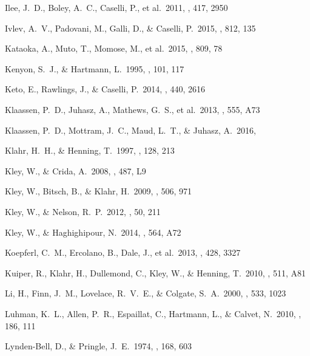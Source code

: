 \begin{thebibliography}{2000b}
 Ilee, J.~D., Boley, A.~C., 
Caselli, P., et al.\ 2011, \mnras, 417, 2950

 Ivlev, A.~V., Padovani, M., Galli, D., \& Caselli, P.\ 2015, \apj, 812, 135 

 Kataoka, A., Muto, T., 
Momose, M., et al.\ 2015, \apj, 809, 78 

 Kenyon, S.~J., \& Hartmann, L.\ 1995, \apjs, 101, 117 

 Keto, E., Rawlings, J., \& Caselli, P.\ 2014, \mnras, 440, 2616 

 Klaassen, P.~D., Juhasz, A., Mathews, G.~S., et al.\ 2013, \aap, 555, A73

 Klaassen, P.~D., Mottram, J.~C., Maud, L.~T., \& Juhasz, A.\ 2016, \mnras

 Klahr, H.~H., \& Henning, T.\ 1997, \icarus, 128, 213 

 Kley, W., \& Crida, A.\ 2008, \aap, 487, L9 

 Kley, W., Bitsch, B., \& Klahr, H.\ 2009, \aap, 506, 971 

 Kley, W., \& Nelson, R.~P.\ 2012, \araa, 50, 211 

 Kley, W., \& Haghighipour, N.\ 2014, \aap, 564, A72 

 Koepferl, C.~M., 
Ercolano, B., Dale, J., et al.\ 2013, \mnras, 428, 3327 

 Kuiper, R., Klahr, H., Dullemond, C., Kley, W., \& Henning, T.\ 2010, \aap, 511, A81 

 Li, H., Finn, J.~M., 
Lovelace, R.~V.~E., \& Colgate, S.~A.\ 2000, \apj, 533, 1023 

 Luhman, K.~L., Allen, 
P.~R., Espaillat, C., Hartmann, L., \& Calvet, N.\ 2010, \apjs, 186, 111 

 Lynden-Bell, D., \& Pringle, J.~E.\ 1974, \mnras, 168, 603 



\end{thebibliography}
